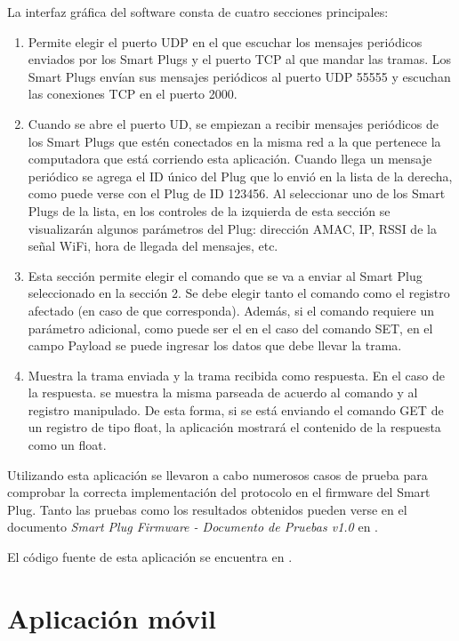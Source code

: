 La interfaz gráfica del software consta de cuatro secciones principales:

\begin{enumerate}
\item Permite elegir el puerto UDP en el que escuchar los mensajes periódicos enviados por los Smart Plugs y el puerto TCP al que mandar las tramas. Los Smart Plugs envían sus mensajes periódicos al puerto UDP 55555 y escuchan las conexiones TCP en el puerto 2000.

\item Cuando se abre el puerto UD, se empiezan a recibir mensajes periódicos de los Smart Plugs que estén conectados en la misma red a la que pertenece la computadora que está corriendo esta aplicación. Cuando llega un mensaje periódico se agrega el ID único del Plug que lo envió en la lista de la derecha, como puede verse con el Plug de ID 123456. Al seleccionar uno de los Smart Plugs de la lista, en los controles de la izquierda de esta sección se visualizarán algunos parámetros del Plug: dirección AMAC, IP, RSSI de la señal WiFi, hora de llegada del mensajes, etc.

\item Esta sección permite elegir el comando que se va a enviar al Smart Plug seleccionado en la sección 2. Se debe elegir tanto el comando como el registro afectado (en caso de que corresponda). Además, si el comando requiere un parámetro adicional, como puede ser el en el caso del comando SET, en el campo Payload se puede ingresar los datos que debe llevar la trama.

\item Muestra la trama enviada y la trama recibida como respuesta. En el caso de la respuesta. se muestra la misma parseada de acuerdo al comando y al registro manipulado. De esta forma, si se está enviando el comando GET de un registro de tipo float, la aplicación mostrará el contenido de la respuesta como un float.
\end{enumerate}

Utilizando esta aplicación se llevaron a cabo numerosos casos de prueba para comprobar la correcta implementación del protocolo en el firmware del Smart Plug. Tanto las pruebas como los resultados obtenidos pueden verse en el documento \textit{Smart Plug Firmware - Documento de Pruebas v1.0} en \citep{repo_docu_firmware}.

El código fuente de esta aplicación se encuentra en \citep{repo_simulador_tcp}.


\section{Aplicación móvil}

